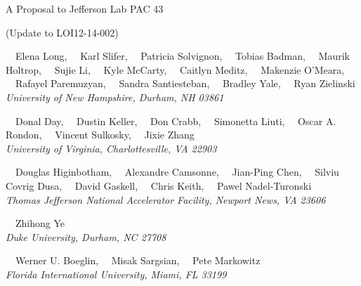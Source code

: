 \begin{center}
A Proposal to Jefferson Lab PAC 43

(Update to LOI12-14-002)

\vspace{15px}

\setcounter{footnote}{\SPOKES}
%
{~~Elena Long,\setcounter{footnote}{\SPOKES}
\setcounter{footnote}{\SPOKES}\footnotemark {}
\setcounter{footnote}{\CONTACT}\footnotemark{}
~~Karl Slifer,\setcounter{footnote}{\SPOKES}\footnotemark
~~Patricia Solvignon,\setcounter{footnote}{\SPOKES}\footnotemark
~~Tobias Badman,
~~Maurik Holtrop,
~~Sujie Li,
~~Kyle McCarty,
~~Caitlyn Meditz,
~~Makenzie O'Meara,
~~Rafayel Paremuzyan,
~~Sandra Santiesteban,
~~Bradley Yale,
~~Ryan Zielinski
}\\
\ls
{\normalsize\it{University of New Hampshire, Durham, NH 03861}}

\vspace{10px}

{~~Donal Day,\setcounter{footnote}{\SPOKES}\footnotemark
~~Dustin Keller,\setcounter{footnote}{\SPOKES}\footnotemark
~~Don Crabb,
~~Simonetta Liuti,
~~Oscar A. Rondon,
~~Vincent Sulkosky,
~~Jixie Zhang}\\
\ls
{\normalsize\it{University of Virginia, Charlottesville, VA 22903}}

\vspace{10px}

{~~Douglas Higinbotham\setcounter{footnote}{\SPOKES}\footnotemark,
~~Alexandre Camsonne,
~~Jian-Ping Chen,
~~Silviu Covrig Dusa,
~~David Gaskell,
~~Chris Keith,
~~Pawel Nadel-Turonski}\\
\ls
{\normalsize\it{Thomas Jefferson National Accelerator Facility, Newport News, VA 23606}}

\vspace{10px}

{~~Zhihong Ye}\\
\ls
{\normalsize\it{Duke University, Durham, NC 27708}}

\vspace{10px}

{~~Werner U. Boeglin,
~~Misak Sargsian,
~~Pete Markowitz}\\
\ls
{\normalsize\it{Florida International University, Miami, FL 33199}}

\vspace{10px}


\end{center}
